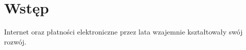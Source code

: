 \section*{Wstęp}

Internet oraz płatności elektroniczne przez lata wzajemnie kształtowały swój rozwój. 